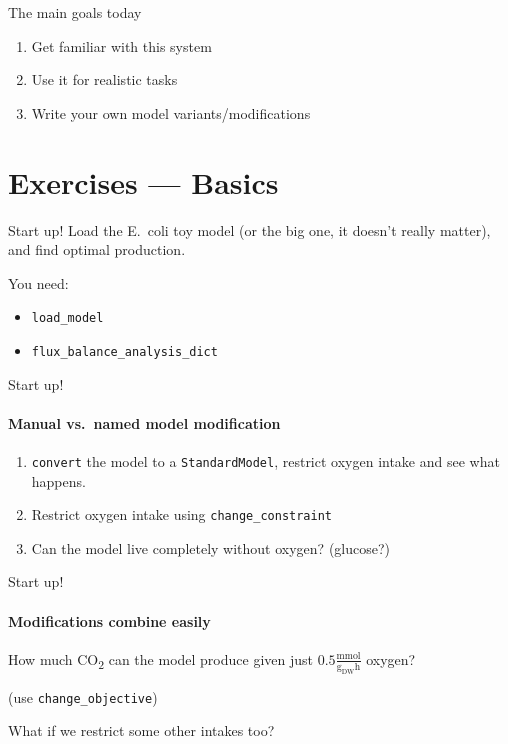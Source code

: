 \documentclass[aspectratio=169]{beamer}
\begin{document}
\begin{frame}{The main goals today}
\begin{enumerate}
\item Get familiar with this system
\item Use it for realistic tasks
\item Write your own model variants/modifications
\end{enumerate}
\end{frame}

\section{Exercises --- Basics}

\begin{frame}[fragile]{Start up!}
Load the E.~coli toy model (or the big one, it doesn't really matter), and find optimal production.

You need:
\begin{itemize}
\item \verb|load_model|
\item \verb|flux_balance_analysis_dict|
\end{itemize}
\end{frame}

\begin{frame}[fragile]{Start up!}
\framesubtitle{Manual vs.~named model modification}

\begin{enumerate}
\item \verb|convert| the model to a \verb|StandardModel|, restrict oxygen intake and see what happens.
\item Restrict oxygen intake using \verb|change_constraint|
\item Can the model live completely without oxygen? (glucose?)
\end{enumerate}
\end{frame}

\begin{frame}[fragile]{Start up!}
\framesubtitle{Modifications combine easily}
How much CO\textsubscript{2} can the model produce given just $0.5 \frac{\text{mmol}}{\text{g}_{\text{DW}} \text{h}}$ oxygen?

(use \verb|change_objective|)

\bigskip
What if we restrict some other intakes too?
\end{frame}
\end{document}
